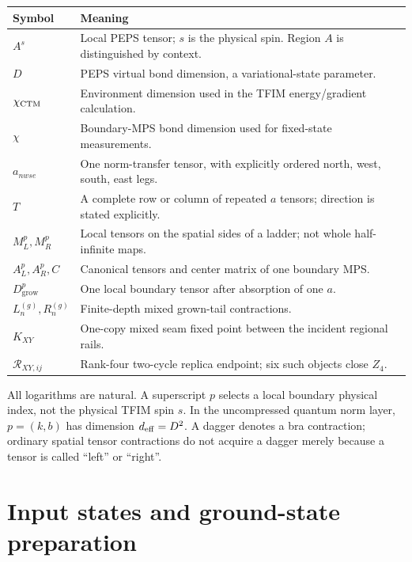 \documentclass[11pt]{article}
\newcommand{\Dg}{D_{\mathrm{grow}}}
\begin{document}
\begin{center}\small
\begin{tabular}{p{28mm}p{116mm}}
\toprule
Symbol & Meaning\\\midrule
$A^s$ & Local PEPS tensor; $s$ is the physical spin. Region $A$ is distinguished by context.\\
$D$ & PEPS virtual bond dimension, a variational-state parameter.\\
$\chi_{\rm CTM}$ & Environment dimension used in the TFIM energy/gradient calculation.\\
$\chi$ & Boundary-MPS bond dimension used for fixed-state measurements.\\
$a_{nwse}$ & One norm-transfer tensor, with explicitly ordered north, west, south, east legs.\\
$T$ & A complete row or column of repeated $a$ tensors; direction is stated explicitly.\\
$M_L^p,M_R^p$ & Local tensors on the spatial sides of a ladder; not whole half-infinite maps.\\
$A_L^p,A_R^p,C$ & Canonical tensors and center matrix of one boundary MPS.\\
$\Dg^p$ & One local boundary tensor after absorption of one $a$.\\
$L_n^{(g)},R_n^{(g)}$ & Finite-depth mixed grown-tail contractions.\\
$K_{XY}$ & One-copy mixed seam fixed point between the incident regional rails.\\
$\mathcal R_{XY,ij}$ & Rank-four two-cycle replica endpoint; six such objects close $Z_4$.\\
\bottomrule
\end{tabular}
\end{center}
All logarithms are natural. A superscript $p$ selects a local boundary physical
index, not the physical TFIM spin $s$. In the uncompressed quantum norm layer,
$p=(k,b)$ has dimension $d_{\rm eff}=D^2$. A dagger denotes a bra contraction;
ordinary spatial tensor contractions do not acquire a dagger merely because
a tensor is called ``left'' or ``right''.

\section{Input states and ground-state preparation}
\end{document}
